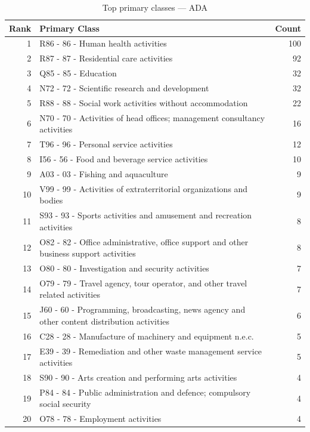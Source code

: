 \begin{table}[h]
    \centering
    \begin{tabular}{r p{10cm} r}
    \hline
    \textbf{Rank} & \textbf{Primary Class} & \textbf{Count} \\
    \hline
    1 & R86 - 86 - Human health activities & 100 \\
    2 & R87 - 87 - Residential care activities & 92 \\
    3 & Q85 - 85 - Education & 32 \\
    4 & N72 - 72 - Scientific research and development & 32 \\
    5 & R88 - 88 - Social work activities without accommodation & 22 \\
    6 & N70 - 70 - Activities of head offices; management consultancy activities & 16 \\
    7 & T96 - 96 - Personal service activities & 12 \\
    8 & I56 - 56 - Food and beverage service activities & 10 \\
    9 & A03 - 03 - Fishing and aquaculture & 9 \\
    10 & V99 - 99 - Activities of extraterritorial organizations and bodies & 9 \\
    11 & S93 - 93 - Sports activities and amusement and recreation activities & 8 \\
    12 & O82 - 82 - Office administrative, office support and other business support activities & 8 \\
    13 & O80 - 80 - Investigation and security activities & 7 \\
    14 & O79 - 79 - Travel agency, tour operator, and other travel related activities & 7 \\
    15 & J60 - 60 - Programming, broadcasting, news agency and other content distribution activities & 6 \\
    16 & C28 - 28 - Manufacture of machinery and equipment n.e.c. & 5 \\
    17 & E39 - 39 - Remediation and other waste management service activities & 5 \\
    18 & S90 - 90 - Arts creation and performing arts activities & 4 \\
    19 & P84 - 84 - Public administration and defence; compulsory social security & 4 \\
    20 & O78 - 78 - Employment activities & 4 \\
    \hline
    \end{tabular}
    \caption{Top primary classes --- ADA}
\end{table}

